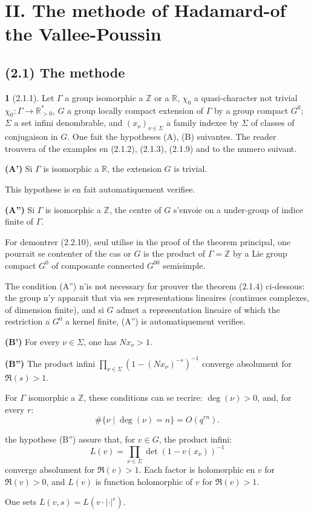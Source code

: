 \documentclass[12pt,a4paper]{article}
\theoremstyle{plain}
\theoremstyle{definition}
\theoremstyle{definition}
\newtheorem{para}{}[section]
\theoremstyle{remark}
\begin{document}
\newpage

\section*{II. The methode of Hadamard-of the Vallee-Poussin}

\subsection*{(2.1) The methode}

\begin{para}[2.1.1]
Let $\Gamma$ a group isomorphic a $\mathbb{Z}$ or a $\mathbb{R}$, $\chi_0$ a quasi-character not trivial $\chi_0: \Gamma \to \mathbb{R}_{>0}^*$, $G$ a group locally compact extension of $\Gamma$ by a group compact $G^0$; $\Sigma$ a set infini denombrable, and $(x_\nu)_{\nu \in \Sigma}$ a family indexee by $\Sigma$ of classes of conjugaison in $G$. One fait the hypotheses (A), (B) suivantes. The reader trouvera of the examples en (2.1.2), (2.1.3), (2.1.9) and to the numero suivant.

\textbf{(A')} Si $\Gamma$ is isomorphic a $\mathbb{R}$, the extension $G$ is trivial.

This hypothese is en fait automatiquement verifiee.

\textbf{(A'')} Si $\Gamma$ is isomorphic a $\mathbb{Z}$, the centre of $G$ s'envoie on a under-group of indice finite of $\Gamma$.

For demontrer (2.2.10), seul utilise in the proof of the theorem principal, one pourrait se contenter of the cas or $G$ is the product of $\Gamma = \mathbb{Z}$ by a Lie group compact $G^0$ of composante connected $G^{00}$ semisimple.

The condition (A'') n'is not necessary for prouver the theorem (2.1.4) ci-dessous: the group n'y apparait that via ses representations lineaires (continues complexes, of dimension finite), and si $G$ admet a representation lineaire of which the restriction a $G^0$ a kernel finite, (A'') is automatiquement verifiee.

\textbf{(B')} For every $\nu \in \Sigma$, one has $Nx_\nu > 1$.

\textbf{(B'')} The product infini $\prod_{\nu \in \Sigma} (1 - (Nx_\nu)^{-s})^{-1}$ converge absolument for $\Re(s) > 1$.

For $\Gamma$ isomorphic a $\mathbb{Z}$, these conditions can se recrire: $\deg(\nu) > 0$, and, for every $r$:
\[\#\{\nu \mid \deg(\nu) = n\} = O(q^{rn}).\]

the hypothese (B'') assure that, for $v \in G$, the product infini:
\[L(v) = \prod_{\nu \in \Sigma} \det(1 - v(x_\nu))^{-1}\]
converge absolument for $\Re(v) > 1$. Each factor is holomorphic en $v$ for $\Re(v) > 0$, and $L(v)$ is function holomorphic of $v$ for $\Re(v) > 1$.

One sets $L(v, s) = L(v \cdot |\cdot|^s)$.
\end{para}
\end{document}
